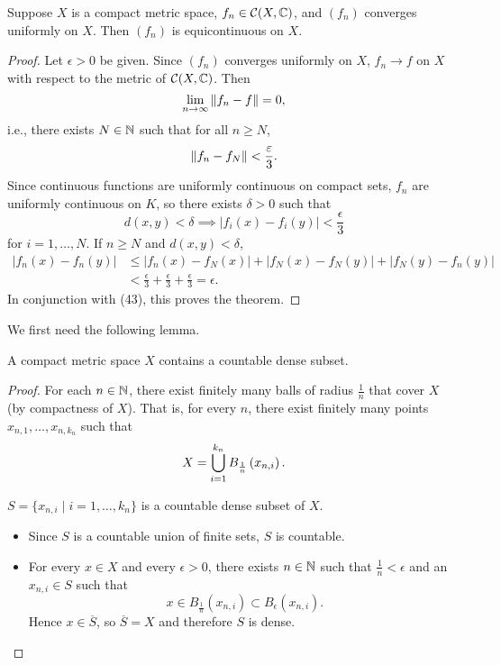 \begin{proposition}
Suppose $X$ is a compact metric space, $f_n\in\mathcal{C}(X,\mathbb C)$, and $(f_n)$ converges uniformly on $X$. Then $(f_n)$ is equicontinuous on $X$. 
\end{proposition}

\begin{proof}
Let $\epsilon>0$ be given. Since $(f_n)$ converges uniformly on $X$, $f_n\to f$ on $X$ with respect to the metric of $\mathcal{C}(X,\mathbb C)$. Then
\[\lim_{n\to\infty}\norm{f_n-f}=0,\]
i.e., there exists $N\in\mathbb N$ such that for all $n\ge N$,
\[\norm{f_n-f_N}<\frac{\varepsilon}{3}.\]
Since continuous functions are uniformly continuous on compact sets, $f_n$ are uniformly continuous on $K$, so there exists $\delta>0$ such that
\[d(x,y)<\delta\implies|f_i(x)-f_i(y)|<\frac{\epsilon}{3}\]
for $i=1,\dots,N$.
If $n\ge N$ and $d(x,y)<\delta$,
\begin{align*}
|f_n(x)-f_n(y)|
&\le|f_n(x)-f_N(x)|+|f_N(x)-f_N(y)|+|f_N(y)-f_n(y)|\\
&<\frac{\epsilon}{3}+\frac{\epsilon}{3}+\frac{\epsilon}{3}=\epsilon.
\end{align*}
In conjunction with (43), this proves the theorem.
\end{proof}

We first need the following lemma.

\begin{lemma}
A compact metric space $X$ contains a countable dense subset.
\end{lemma}

\begin{proof}
For each $n\in\mathbb N$, there exist finitely many balls of radius $\frac{1}{n}$ that cover $X$ (by compactness of $X$). That is, for every $n$, there exist finitely many points $x_{n,1},\dots,x_{n,k_n}$ such that
\[X=\bigcup_{i=1}^{k_n}B_\frac{1}{n}\left(x_{n,i}\right).\]
\begin{claim}
$S=\{x_{n,i}\mid i=1,\dots,k_n\}$ is a countable dense subset of $X$.
\end{claim}
\begin{itemize}
\item Since $S$ is a countable union of finite sets, $S$ is countable.
\item For every $x\in X$ and every $\epsilon>0$, there exists $n\in\mathbb N$ such that $\frac{1}{n}<\epsilon$ and an $x_{n,i}\in S$ such that
\[x\in B_\frac{1}{n}(x_{n,i})\subset B_\epsilon(x_{n,i}).\]
Hence $x\in\overline{S}$, so $\overline{S}=X$ and therefore $S$ is dense.
\end{itemize}
\end{proof}


